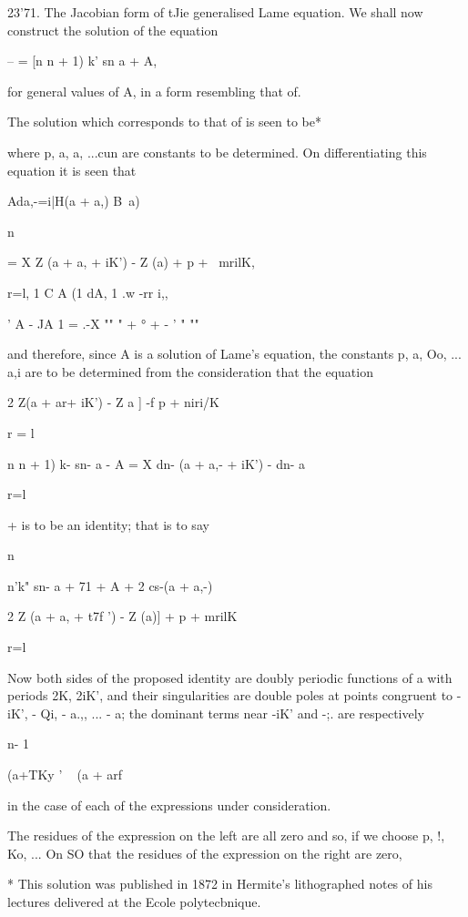 {{{{{{{{%
%

23'71. The Jacobian form of tJie generalised Lame equation. We shall
now construct the solution of the equation

-- = [n n + 1) k' sn a + A,

for general values of A, in a form resembling that of.

The solution which corresponds to that of is seen to be*

where p, a, a, ...cun are constants to be determined. On
differentiating this equation it is seen that

Ada,-=i|H(a + a,) B\ a)\ \

n

= X Z (a + a, + iK') - Z (a) + p + \ mrilK,

r=l, 1 C A (1 dA, 1 .w -rr i,,

   ' A - JA 1 = .-X "" " + ° + - ' " ""

and therefore, since A is a solution of Lame's equation, the constants
p, a, Oo, ... a,i are to be determined from the consideration that
the equation

2 Z(a + ar+ iK') - Z a ] -f p + niri/K

r = l

n n + 1) k- sn- a - A = X dn- (a + a,- + iK') - dn- a

r=l

+ is to be an identity; that is to say

n

n'k" sn- a + 71 + A + 2 cs-(a + a,-)

2 Z (a + a, + t7f ') - Z (a)] + p + mrilK

r=l

Now both sides of the proposed identity are doubly periodic functions
of a with periods 2K, 2iK', and their singularities are double poles
at points congruent to -iK', - Qi, - a.,, ... - a; the dominant terms
near -iK' and -;. are respectively

n- 1

(a+TKy ' ~ (a + arf

in the case of each of the expressions under consideration.

The residues of the expression on the left are all zero and so, if we
choose p, !, Ko, ... On SO that the residues of the expression on the
right are zero,

* This solution was published in 1872 in Hermite's lithographed notes
of his lectures delivered at the Ecole polytecbnique.

}}}}}}}}
